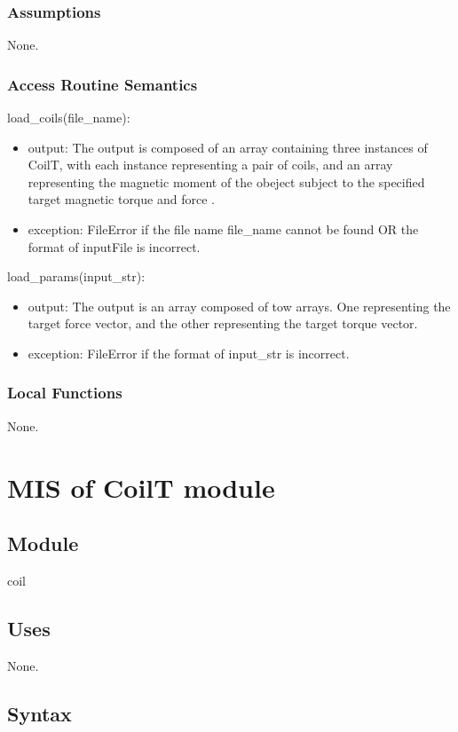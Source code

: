 \documentclass[12pt, titlepage]{article}
\begin{document}
\subsubsection{Assumptions}
None.

\subsubsection{Access Routine Semantics}
\noindent load\_coils(file\_name):
\begin{itemize}
\item output: The output is composed of an array containing three instances of CoilT, with each instance representing a pair of coils, and an array representing the magnetic moment of the obeject subject to the specified target magnetic torque and force .  
\item exception: FileError if the file name file\_name cannot be found OR the format of inputFile is incorrect.
\end{itemize}
\noindent load\_params(input\_str):
\begin{itemize}
\item output: The output is an array composed of tow arrays. One representing the target force vector, and the other representing the target torque vector.
\item exception: FileError if the format of input\_str is incorrect.
\end{itemize}

\subsubsection{Local Functions}
None.


\section{MIS of CoilT module} \label{MCT}

\subsection{Module}
coil

\subsection{Uses}
None.

\subsection{Syntax}
\end{document}
